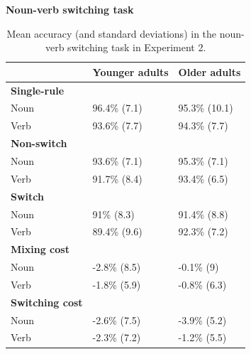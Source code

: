 \documentclass[
]{article}
\begin{document}
\newpage

\textbf{Noun-verb switching task}

\begin{table}[H]

\caption{\label{tab:tableS9}Mean accuracy (and standard deviations) in the noun-verb switching task in Experiment 2.}
\centering
\begin{tabular}[t]{lll}
\toprule
\textbf{} & \textbf{Younger adults} & \textbf{Older adults}\\
\midrule
\textbf{Single-rule} & \textbf{} & \textbf{}\\
Noun & 96.4\% (7.1) & 95.3\% (10.1)\\
Verb & 93.6\% (7.7) & 94.3\% (7.7)\\
\textbf{Non-switch} & \textbf{} & \textbf{}\\
Noun & 93.6\% (7.1) & 95.3\% (7.1)\\
\addlinespace
Verb & 91.7\% (8.4) & 93.4\% (6.5)\\
\textbf{Switch} & \textbf{} & \textbf{}\\
Noun & 91\% (8.3) & 91.4\% (8.8)\\
Verb & 89.4\% (9.6) & 92.3\% (7.2)\\
\textbf{Mixing cost} & \textbf{} & \textbf{}\\
\addlinespace
Noun & -2.8\% (8.5) & -0.1\% (9)\\
Verb & -1.8\% (5.9) & -0.8\% (6.3)\\
\textbf{Switching cost} & \textbf{} & \textbf{}\\
Noun & -2.6\% (7.5) & -3.9\% (5.2)\\
Verb & -2.3\% (7.2) & -1.2\% (5.5)\\
\bottomrule
\end{tabular}
\end{table}

\newpage
\end{document}
